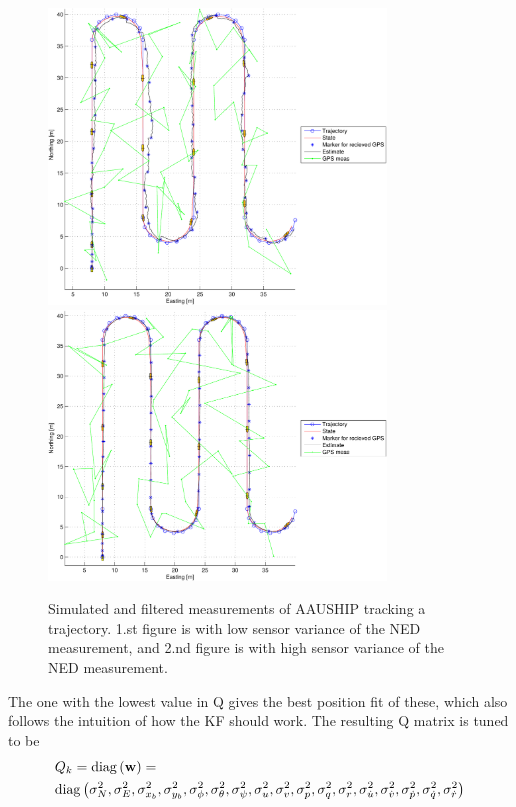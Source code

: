 \begin{figure}
\centering
  \includegraphics[width=0.8\textwidth]{../../code/matlab/q0,001}
  \includegraphics[width=0.8\textwidth]{../../code/matlab/q0,00001}
  \caption{Simulated and filtered measurements of AAUSHIP tracking a trajectory. 1.st figure is with low sensor variance of the NED measurement, and 2.nd figure is with high sensor variance of the NED measurement.}
  \label{fig:postest0,00001}
\end{figure}
The one with the lowest value in Q gives the best position fit of these, which also follows the intuition of how the \ac{KF} should work. The resulting Q matrix is tuned to be
\begin{align}
&Q_k = \mathrm{diag}\left(\mathbf{w}\right) = \\ \nonumber
&\mathrm{diag}\left(\sigma_{N}^2, \sigma_{E}^2, \sigma_{x_{b}}^2, \sigma_{y_{b}}^2, \sigma_{\phi}^2, \sigma_{\theta}^2, \sigma_{\psi}^2, \sigma_{u}^2, \sigma_{v}^2, \sigma_{p}^2, \sigma_{q}^2, \sigma_{r}^2, \sigma_{\dot u}^2, \sigma_{\dot v}^2, \sigma_{\dot p}^2, \sigma_{\dot q}^2, \sigma_{\dot r}^2\right)
\end{align}

